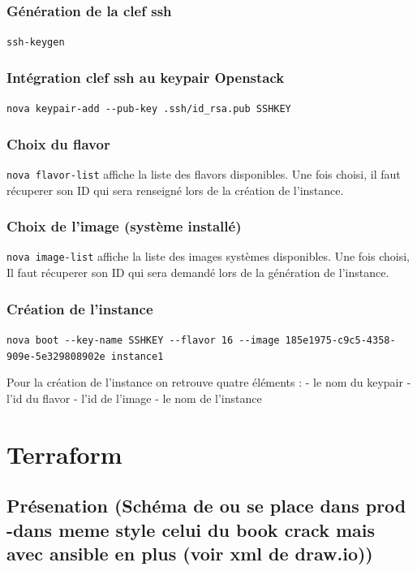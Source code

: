 \documentclass[]{article}
\begin{document}
\subsubsection{Génération de la clef
ssh}\label{guxe9nuxe9ration-de-la-clef-ssh}

\texttt{ssh-keygen}

\subsubsection{Intégration clef ssh au keypair
Openstack}\label{intuxe9gration-clef-ssh-au-keypair-openstack}

\texttt{nova\ keypair-add\ -\/-pub-key\ .ssh/id\_rsa.pub\ SSHKEY}

\subsubsection{Choix du flavor}\label{choix-du-flavor}

\texttt{nova\ flavor-list} affiche la liste des flavors disponibles. Une
fois choisi, il faut récuperer son ID qui sera renseigné lors de la
création de l'instance.

\subsubsection{Choix de l'image (système
installé)}\label{choix-de-limage-systuxe8me-installuxe9}

\texttt{nova\ image-list} affiche la liste des images systèmes
disponibles. Une fois choisi, Il faut récuperer son ID qui sera demandé
lors de la génération de l'instance.

\subsubsection{Création de l'instance}\label{cruxe9ation-de-linstance-1}

\texttt{nova\ boot\ -\/-key-name\ SSHKEY\ -\/-flavor\ 16\ -\/-image\ 185e1975-c9c5-4358-909e-5e329808902e\ instance1}

Pour la création de l'instance on retrouve quatre éléments : - le nom du
keypair - l'id du flavor - l'id de l'image - le nom de l'instance


\section{Terraform}\label{terraform}

\subsection{Présenation (Schéma de ou se place dans prod -dans meme
style celui du book crack mais avec ansible en plus (voir xml de
draw.io))}\label{pruxe9senation-schuxe9ma-de-ou-se-place-dans-prod--dans-meme-style-celui-du-book-crack-mais-avec-ansible-en-plus-voir-xml-de-draw.io}
\end{document}
